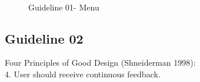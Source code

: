 \documentclass{article}
\begin{document}
\begin{figure}[H]
  \centering

%
\qquad
    \qquad
     \\
    \caption{Guideline 01- Menu}%
\end{figure}

\subsection{Guideline 02}
Four Principles of Good Design (Shneiderman 1998):\\
4. User should receive continuous feedback. \\
\end{document}
